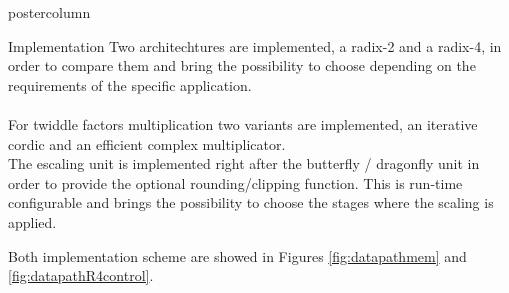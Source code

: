 \documentclass[final]{beamer}
\begin{document}
\begin{frame}{}
\begin{columns}
\begin{column}{.5\textwidth}
\begin{beamercolorbox}[center,wd=0.9\textwidth]{postercolumn}
\begin{minipage}[T]{.99\textwidth}
{\begin{block}{Implementation}
			Two architechtures are implemented, a radix-2 and a radix-4, in order to compare them and bring the possibility to choose
			depending on the requirements of the specific application.\\
			~\\
			For twiddle factors multiplication two variants are implemented, an iterative cordic and an efficient complex multiplicator.\\
			The escaling unit is implemented right after the butterfly / dragonfly unit in order to provide the optional rounding/clipping function. This is 
			run-time configurable and brings the possibility to choose the stages where the scaling is applied. 
			
			Both implementation scheme are showed in Figures \ref{fig:datapathmem} and \ref{fig:datapathR4control}.
			

\end{block}}
\end{minipage}
\end{beamercolorbox}
\end{column}
\end{columns}
\end{frame}
\end{document}
